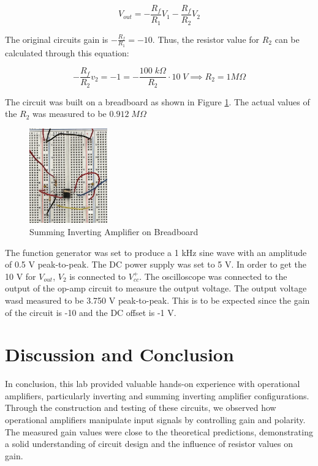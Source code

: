 \documentclass[12pt]{article}
\begin{document}
\begin{equation*}
	V_{out} = -\frac{R_f}{R_1}V_{1} - \frac{R_f}{R_2}V_{2}
\end{equation*}

The original circuits gain is $-\frac{R_f}{R_1} = -10$. Thus, the 
resistor value for $R_2$ can be calculated through this equation:

\begin{equation*}
	-\frac{R_f}{R_2}v_2 = -1 = -\frac{100 \; k \Omega}{R_2} \cdot 10 \; V \implies R_2 = 1 M \Omega
\end{equation*}

The circuit was built on a breadboard as shown in Figure \ref{fig:fig5}.
The actual values of the $R_2$ was measured to be $0.912 \; M \Omega$

\begin{figure}[H]
	\centering
	\includegraphics[width=0.3\textwidth]{IMG_0483.png}
	\caption{Summing Inverting Amplifier on Breadboard}
	\label{fig:fig5}
\end{figure}

The function generator was set to produce a 1 kHz sine wave with an 
amplitude of 0.5 V peak-to-peak. The DC power supply was set to 5 V.
In order to get the 10 V for $V_{out}$, $V_2$ is connected to $V_{cc}^+$.
The oscilloscope was connected to the output of the op-amp circuit to measure
the output voltage. The output voltage wasd measured to be 3.750 V peak-to-peak.
This is to be expected since the gain of the circuit is -10 and the DC offset
is -1 V. 


\section{Discussion and Conclusion}
In conclusion, this lab provided valuable hands-on experience with 
operational amplifiers, particularly inverting and summing inverting 
amplifier configurations. Through the construction and testing of these 
circuits, we observed how operational amplifiers manipulate input 
signals by controlling gain and polarity. The measured gain values 
were close to the theoretical predictions, demonstrating a solid 
understanding of circuit design and the influence of resistor values 
on gain.
\newline
\end{document}

